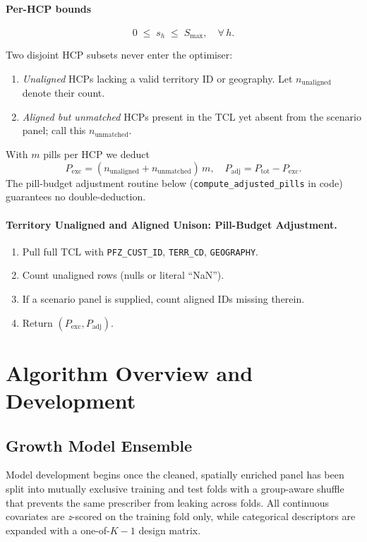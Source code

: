 \paragraph{Per-HCP bounds}
\[
  0 \;\le\; s_h \;\le\; S_{\max},
  \quad\forall\,h.
\]

Two disjoint HCP subsets never enter the optimiser:
\begin{enumerate}
  \item \emph{Unaligned} HCPs lacking a valid territory ID or geography. Let \(n_{\mathrm{unaligned}}\) denote their count.
  \item \emph{Aligned but unmatched} HCPs present in the TCL yet absent from the scenario panel; call this \(n_{\mathrm{unmatched}}\).
\end{enumerate}

With \(m\) pills per HCP we deduct
\[
  P_{\mathrm{exc}}
    = (n_{\mathrm{unaligned}} + n_{\mathrm{unmatched}})\,m,
  \quad
  P_{\mathrm{adj}}
    = P_{\mathrm{tot}} - P_{\mathrm{exc}}.
\]
The pill-budget adjustment routine below (\texttt{compute\_adjusted\_pills} in code) guarantees no double-deduction.

\paragraph{Territory Unaligned and Aligned Unison: Pill-Budget Adjustment.}
\begin{enumerate}
  \item Pull full TCL with \texttt{PFZ\_CUST\_ID}, \texttt{TERR\_CD}, \texttt{GEOGRAPHY}.
  \item Count unaligned rows (nulls or literal ``NaN'').
  \item If a scenario panel is supplied, count aligned IDs missing therein.
  \item Return \((P_{\mathrm{exc}},P_{\mathrm{adj}})\).
\end{enumerate}

\section{Algorithm Overview and Development}

\subsection{Growth Model Ensemble}

Model development begins once the cleaned, spatially enriched panel has been split into mutually exclusive training and test folds with a group-aware shuffle that prevents the same prescriber from leaking across folds. All continuous covariates are \emph{z}-scored on the training fold only, while categorical descriptors are expanded with a one-of-\(K\!-\!1\) design matrix.

